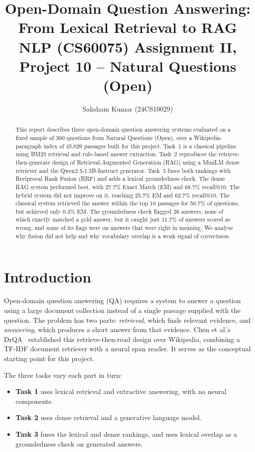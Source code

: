 \documentclass[11pt,a4paper]{article}
\title{Open-Domain Question Answering:\\From Lexical Retrieval to RAG\\[0.3em]
\large NLP (CS60075) Assignment II, Project 10 -- Natural Questions (Open)}
\author{Saksham Kumar (24CS10029)}
\begin{document}
\maketitle

\begin{abstract}
This report describes three open-domain question answering systems evaluated on a fixed sample of 300 questions from Natural Questions (Open), over a Wikipedia-paragraph index of 45,029 passages built for this project. Task~1 is a classical pipeline using BM25 retrieval and rule-based answer extraction. Task~2 reproduces the retrieve-then-generate design of Retrieval-Augmented Generation (RAG) using a MiniLM dense retriever and the Qwen2.5-1.5B-Instruct generator. Task~3 fuses both rankings with Reciprocal Rank Fusion (RRF) and adds a lexical groundedness check. The dense RAG system performed best, with 27.7\% Exact Match (EM) and 68.7\% recall@10. The hybrid system did not improve on it, reaching 25.7\% EM and 62.7\% recall@10. The classical system retrieved the answer within the top 10 passages for 56.7\% of questions, but achieved only 0.3\% EM. The groundedness check flagged 26 answers, none of which exactly matched a gold answer, but it caught just 11.7\% of answers scored as wrong, and some of its flags were on answers that were right in meaning. We analyse why fusion did not help and why vocabulary overlap is a weak signal of correctness.
\end{abstract}

\section{Introduction}

Open-domain question answering (QA) requires a system to answer a question using a large document collection instead of a single passage supplied with the question. The problem has two parts: \emph{retrieval}, which finds relevant evidence, and \emph{answering}, which produces a short answer from that evidence. Chen et al.'s DrQA~\cite{drqa} established this retrieve-then-read design over Wikipedia, combining a TF-IDF document retriever with a neural span reader. It serves as the conceptual starting point for this project.

The three tasks vary each part in turn:
\begin{itemize}
    \item \textbf{Task 1} uses lexical retrieval and extractive answering, with no neural components.
    \item \textbf{Task 2} uses dense retrieval and a generative language model.
    \item \textbf{Task 3} fuses the lexical and dense rankings, and uses lexical overlap as a groundedness check on generated answers.
\end{itemize}
\end{document}
